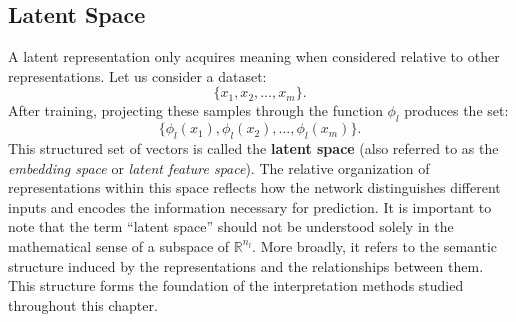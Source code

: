 \subsection{Latent Space}
A latent representation only acquires meaning when considered relative to other representations.
Let us consider a dataset:
\[
\{x_1, x_2, \dots, x_m\}.
\]
After training, projecting these samples through the function \( \phi_l \) produces the set:
\[
\{\phi_l(x_1), \phi_l(x_2), \dots, \phi_l(x_m)\}.
\]
This structured set of vectors is called the \textbf{latent space} (also referred to as the \textit{embedding space} or \textit{latent feature space}).
The relative organization of representations within this space reflects how the network distinguishes different inputs and encodes the information necessary for prediction.
It is important to note that the term ``latent space'' should not be understood solely in the mathematical sense of a subspace of \( \mathbb{R}^{n_l} \).
More broadly, it refers to the semantic structure induced by the representations and the relationships between them.
This structure forms the foundation of the interpretation methods studied throughout this chapter.